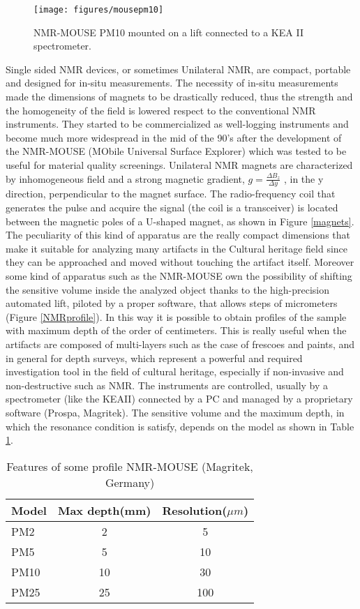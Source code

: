\documentclass[a4paper,11pt]{report}
\begin{document}
\begin{figure}[h]
      	\centering
      	\texttt{[image: figures/mousepm10]}
      	\caption{NMR-MOUSE PM10 mounted on a lift connected to a KEA II spectrometer.}\label{mousepm10}
      \end{figure}
Single sided NMR devices, or sometimes Unilateral NMR, are compact, portable and designed for in-situ measurements. The necessity of in-situ measurements made the dimensions of magnets to be drastically reduced, thus the strength and 
the homogeneity of the field is lowered respect to the conventional NMR instruments.
They started to be commercialized as well-logging instruments and become much more widespread in the mid of the 90's after the development of the NMR-MOUSE (MObile Universal Surface Explorer) which was tested to be useful for material quality screenings\cite{cinque}. Unilateral NMR magnets are characterized by inhomogeneous field and a strong magnetic gradient, $g=\frac{\Delta B_z}{\Delta y}$ , in the y direction, perpendicular to the magnet surface.
The radio-frequency coil that generates the pulse and acquire the signal (the coil is a transceiver) is located between the magnetic poles of a U-shaped magnet, as shown in Figure \ref{magnets}. The peculiarity of this kind of apparatus are the really compact dimensions that make it suitable for analyzing many artifacts in the Cultural heritage field since they can be approached and moved without touching the artifact itself. Moreover some kind of apparatus such as the NMR-MOUSE own the possibility of shifting the sensitive volume inside the analyzed object thanks to the high-precision automated lift, piloted by a proper software, that allows steps of micrometers (Figure \ref{NMRprofile}). In this way it is possible to obtain profiles of the sample with maximum depth of the order of centimeters. This is really useful when the artifacts are composed of multi-layers such as the case of frescoes and paints, and in general for depth surveys, which represent a powerful and required investigation tool in the field of cultural heritage, especially if non-invasive and non-destructive such as NMR. The instruments are controlled, usually by a spectrometer (like the KEAII) connected by a PC and managed by a proprietary software (Prospa, Magritek). The sensitive volume and the maximum depth, in which the resonance condition is satisfy, depends on the model as shown in Table \ref{Table:1}. 


\begin{table}[h] 
\centering
\begin{tabular}{lcc}

\toprule
Model  & Max depth(mm) & Resolution($\mu m$) \\
\midrule
PM2 &2 & 5\\
PM5 & 5&10 \\
PM10 &10 & 30\\
PM25 & 25& 100\\
\bottomrule

\end{tabular}

\caption{Features of some profile  NMR-MOUSE (Magritek, Germany)}\label{Table:1}

\end{table}
\end{document}
